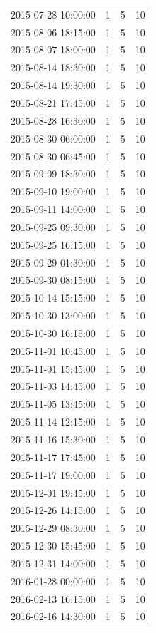 \begin{tabular}{lrrr}
2015-07-28 10:00:00 & 1 & 5 & 10 \\
2015-08-06 18:15:00 & 1 & 5 & 10 \\
2015-08-07 18:00:00 & 1 & 5 & 10 \\
2015-08-14 18:30:00 & 1 & 5 & 10 \\
2015-08-14 19:30:00 & 1 & 5 & 10 \\
2015-08-21 17:45:00 & 1 & 5 & 10 \\
2015-08-28 16:30:00 & 1 & 5 & 10 \\
2015-08-30 06:00:00 & 1 & 5 & 10 \\
2015-08-30 06:45:00 & 1 & 5 & 10 \\
2015-09-09 18:30:00 & 1 & 5 & 10 \\
2015-09-10 19:00:00 & 1 & 5 & 10 \\
2015-09-11 14:00:00 & 1 & 5 & 10 \\
2015-09-25 09:30:00 & 1 & 5 & 10 \\
2015-09-25 16:15:00 & 1 & 5 & 10 \\
2015-09-29 01:30:00 & 1 & 5 & 10 \\
2015-09-30 08:15:00 & 1 & 5 & 10 \\
2015-10-14 15:15:00 & 1 & 5 & 10 \\
2015-10-30 13:00:00 & 1 & 5 & 10 \\
2015-10-30 16:15:00 & 1 & 5 & 10 \\
2015-11-01 10:45:00 & 1 & 5 & 10 \\
2015-11-01 15:45:00 & 1 & 5 & 10 \\
2015-11-03 14:45:00 & 1 & 5 & 10 \\
2015-11-05 13:45:00 & 1 & 5 & 10 \\
2015-11-14 12:15:00 & 1 & 5 & 10 \\
2015-11-16 15:30:00 & 1 & 5 & 10 \\
2015-11-17 17:45:00 & 1 & 5 & 10 \\
2015-11-17 19:00:00 & 1 & 5 & 10 \\
2015-12-01 19:45:00 & 1 & 5 & 10 \\
2015-12-26 14:15:00 & 1 & 5 & 10 \\
2015-12-29 08:30:00 & 1 & 5 & 10 \\
2015-12-30 15:45:00 & 1 & 5 & 10 \\
2015-12-31 14:00:00 & 1 & 5 & 10 \\
2016-01-28 00:00:00 & 1 & 5 & 10 \\
2016-02-13 16:15:00 & 1 & 5 & 10 \\
2016-02-16 14:30:00 & 1 & 5 & 10 \\

\end{tabular}
